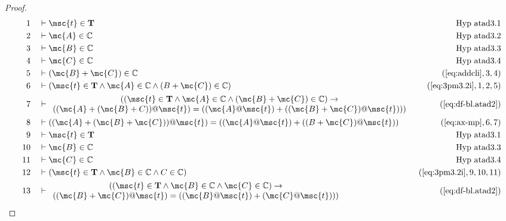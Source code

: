 \begin{proof}
\begin{align}
  1 &&  & \vdash \msc{t} \in \mathbf{T}&\text{Hyp~atad3.1}\notag%
  \\ 2 &&  & \vdash \mc{A} \in \mathbb{C}&\text{Hyp~atad3.2}\notag%
  \\ 3 &&  & \vdash \mc{B} \in \mathbb{C}&\text{Hyp~atad3.3}\notag%
  \\ 4 &&  & \vdash \mc{C} \in \mathbb{C}&\text{Hyp~atad3.4}\notag%
  \\ 5 &&  & \vdash ( \mc{B} + \mc{C} ) \in \mathbb{C}&(\mbox{\ref{eq:addcli}},3,4)\notag
  \\ 6 &&  & \vdash ( \msc{t} \in \mathbf{T} \wedge \mc{A} \in \mathbb{C} \wedge ( B
     + \mc{C} ) \in \mathbb{C}
     )&(\mbox{\ref{eq:3pm3.2i}},1,2,5)\notag
  \\ 7 &&  & \vdash 
     \begin{array}{c}
     ( ( \msc{t} \in \mathbf{T} \wedge \mc{A} \in \mathbb{C} \wedge (
     \mc{B} + \mc{C} ) \in \mathbb{C} ) \rightarrow \notag \\ 
     ( ( \mc{A} + ( \mc{B} + C
     ) ) @ \msc{t} ) = ( ( \mc{A} @ \msc{t} ) + ( ( \mc{B} + \mc{C} ) @
     \msc{t} ) ) )
     \end{array}
     &(\mbox{\ref{eq:df-bl.atad2}})\notag
  \\ 8 &&  & \vdash ( ( \mc{A} + ( \mc{B} + \mc{C} ) ) @ \msc{t} ) = ( ( \mc{A} @ \msc{t} ) + ( ( B
     + \mc{C} ) @ \msc{t} ) )&(\mbox{\ref{eq:ax-mp}},6,7)\notag
  \\ 9 &&  & \vdash \msc{t} \in \mathbf{T}&\text{Hyp~atad3.1}\notag%
  \\ 10 &&  & \vdash \mc{B} \in \mathbb{C}&\text{Hyp~atad3.3}\notag%
  \\ 11 &&  & \vdash \mc{C} \in \mathbb{C}&\text{Hyp~atad3.4}\notag%
  \\ 12 &&  & \vdash ( \msc{t} \in \mathbf{T} \wedge \mc{B} \in \mathbb{C} \wedge C
     \in \mathbb{C}
     )&(\mbox{\ref{eq:3pm3.2i}},9,10,11)\notag
  \\ 13 &&  & \vdash 
     \begin{array}{c}
     ( ( \msc{t} \in \mathbf{T} \wedge \mc{B} \in \mathbb{C} \wedge
     \mc{C} \in \mathbb{C} ) \rightarrow \notag \\
      ( ( \mc{B} + \mc{C} ) @ \msc{t}
     ) = ( ( \mc{B} @ \msc{t} ) + ( \mc{C} @ \msc{t} ) )
     )
     \end{array}
     &(\mbox{\ref{eq:df-bl.atad2}})\notag

\end{align}
\end{proof}
